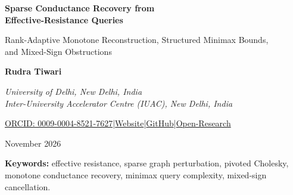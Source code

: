 \documentclass[11pt,letterpaper]{article}
\begin{document}
\thispagestyle{empty}
\begin{center}
\vspace*{0.22in}
{\LARGE\bfseries Sparse Conductance Recovery from\\[.15em] Effective-Resistance Queries\par}
\vspace{0.20in}
{\large Rank-Adaptive Monotone Reconstruction, Structured Minimax Bounds,\\[.1em] and Mixed-Sign Obstructions\par}
\vspace{0.24in}
{\normalsize\bfseries Rudra Tiwari\par}
\vspace{0.03in}
{\normalsize\itshape University of Delhi, New Delhi, India\\Inter-University Accelerator Centre (IUAC), New Delhi, India\par}
\vspace{0.10in}
{\small\href{https://orcid.org/0009-0004-8521-7627}{ORCID: 0009-0004-8521-7627}\quad|\quad\href{https://rtx09x.github.io/}{Website}\quad|\quad\href{https://github.com/Rtx09x}{GitHub}\quad|\quad\href{https://github.com/Rtx09x/Open-Research/tree/main/engineering/sparse-conductance-recovery}{Open-Research}\par}
\vspace{0.15in}
{\normalsize November 2026\par}
\end{center}
\vspace{0.16in}
\begin{abstract}
A known weighted graph can be reconstructed after unknown-location, same-direction conductance changes from a rank-adaptive number of exact effective-resistance queries. For a connected target, the count is $(r+1)(n-1)-r(r+1)/2$, where $r$ is the rank of the Laplacian change. The algorithm applies classical pivoted Cholesky to a rooted Gram matrix, inferring direction and stopping rank within the promised monotone class. Decreases that disconnect the graph admit the same bound with $t=c-1+\sum_C r_C\le k$ replacing $r$, using the baseline induced on each recovered component. Mixed signs behave differently: six changes to existing edges of a unit complete baseline, with target conductances in $[3/4,5/4]$, can require quadratically many randomized queries and nearly all pairs deterministically. Only four readings change. A balanced baseline makes all six relative severities constant. If new edges are permitted, a three-change star construction reduces exactly to one-marked-pair search. Structured baselines admit sharper monotone bounds: $O(n+(k+t)^2)$ for known weighted $t$-class blow-ups, including disconnected weakening, and sharp class-wide minimax $\Theta(\min\{n^2,n+K^2\})$ for product-weight complete baselines with at most $K\ge1$ changes. These are exact-oracle results, with full reconstruction and support-only recovery distinguished throughout.
\end{abstract}
\vspace{0.12in}
\noindent\textbf{Keywords:} effective resistance, sparse graph perturbation, pivoted Cholesky, monotone conductance recovery, minimax query complexity, mixed-sign cancellation.
\clearpage
\tableofcontents
\clearpage
\end{document}
